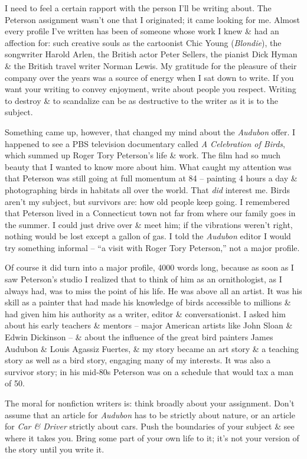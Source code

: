\documentclass{article}
\numberwithin{equation}{section}
\begin{document}
I need to feel a certain rapport with the person I'll be writing about. The Peterson assignment wasn't one that I originated; it came looking for me. Almost every profile I've written has been of someone whose work I knew \& had an affection for: such creative souls as the cartoonist Chic Young (\textit{Blondie}), the songwriter Harold Arlen, the British actor Peter Sellers, the pianist Dick Hyman \& the British travel writer Norman Lewis. My gratitude for the pleasure of their company over the years was a source of energy when I sat down to write. If you want your writing to convey enjoyment, write about people you respect. Writing to destroy \& to scandalize can be as destructive to the writer as it is to the subject.

Something came up, however, that changed my mind about the \textit{Audubon} offer. I happened to see a PBS television documentary called \textit{A Celebration of Birds}, which summed up Roger Tory Peterson's life \& work. The film had so much beauty that I wanted to know more about him. What caught my attention was that Peterson was still going at full momentum at 84 -- painting 4 hours a day \& photographing birds in habitats all over the world. That \textit{did} interest me. Birds aren't my subject, but survivors are: how old people keep going. I remembered that Peterson lived in a Connecticut town not far from where our family goes in the summer. I could just drive over \& meet him; if the vibrations weren't right, nothing would be lost except a gallon of gas. I told the \textit{Audubon} editor I would try something informal -- ``a visit with Roger Tory Peterson,'' not a major profile.

Of course it did turn into a major profile, 4000 words long, because as soon as I saw Peterson's studio I realized that to think of him as an ornithologist, as I always had, was to miss the point of his life. He was above all an artist. It was his skill as a painter that had made his knowledge of birds accessible to millions \& had given him his authority as a writer, editor \& conversationist. I asked him about his early teachers \& mentors -- major American artists like John Sloan \& Edwin Dickinson -- \& about the influence of the great bird painters James Audubon \& Louis Agassiz Fuertes, \& my story became an art story \& a teaching story as well as a bird story, engaging many of my interests. It was also a survivor story; in his mid-80s Peterson was on a schedule that would tax a man of 50.

The moral for nonfiction writers is: think broadly about your assignment. Don't assume that an article for \textit{Audubon} has to be strictly about nature, or an article for \textit{Car \& Driver} strictly about cars. Push the boundaries of your subject \& see where it takes you. Bring some part of your own life to it; it's not your version of the story until you write it.
\end{document}
